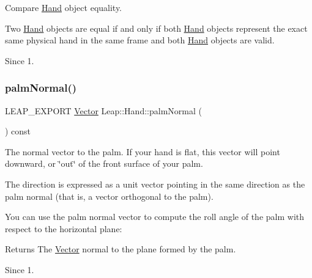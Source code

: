 Compare \hyperlink{class_leap_1_1_hand}{Hand} object equality.


\begin{DoxyCodeInclude}
\end{DoxyCodeInclude}


Two \hyperlink{class_leap_1_1_hand}{Hand} objects are equal if and only if both \hyperlink{class_leap_1_1_hand}{Hand} objects represent the exact same physical hand in the same frame and both \hyperlink{class_leap_1_1_hand}{Hand} objects are valid. \begin{DoxySince}{Since}
1. 
\end{DoxySince}
\mbox{\label{class_leap_1_1_hand_ae47ff36b818f724db2f139a6e3fa0eb3}} 
\subsubsection{\texorpdfstring{palm\+Normal()}{palmNormal()}}
{\footnotesize\ttfamily L\+E\+A\+P\+\_\+\+E\+X\+P\+O\+RT \hyperlink{struct_leap_1_1_vector}{Vector} Leap\+::\+Hand\+::palm\+Normal (\begin{DoxyParamCaption}{ }\end{DoxyParamCaption}) const}

The normal vector to the palm. If your hand is flat, this vector will point downward, or \char`\"{}out\char`\"{} of the front surface of your palm.



The direction is expressed as a unit vector pointing in the same direction as the palm normal (that is, a vector orthogonal to the palm).

You can use the palm normal vector to compute the roll angle of the palm with respect to the horizontal plane\+:


\begin{DoxyCodeInclude}
\end{DoxyCodeInclude}


\begin{DoxyReturn}{Returns}
The \hyperlink{struct_leap_1_1_vector}{Vector} normal to the plane formed by the palm. 
\end{DoxyReturn}
\begin{DoxySince}{Since}
1. 
\end{DoxySince}
\mbox{\label{class_leap_1_1_hand_a4c5037d0f2bdad73d2ba31f8a5b53e67}} 
